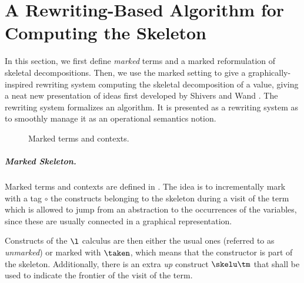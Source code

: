 
\section{A Rewriting-Based Algorithm for Computing the Skeleton}
\label{sect:algorithm}

In this section, we first define \emph{marked} terms and a marked reformulation of skeletal decompositions. Then, we use the marked setting to give a graphically-inspired rewriting system computing the skeletal decomposition of a value, giving a neat new presentation of ideas first developed by Shivers and Wand \cite{DBLP:journals/fuin/ShiversW10}. The rewriting system formalizes an algorithm. It is presented as a rewriting system as to smoothly manage it as an operational semantics notion.



\begin{figure}[t!]
\centering
{}
\caption{Marked terms and contexts.}
\label{fig:marked-terms}
\end{figure}

\subparagraph{Marked Skeleton.} Marked terms and contexts are defined in . The idea is to incrementally mark with a tag $\circ$ the constructs belonging to the skeleton during a visit of the term which is allowed to jump from an abstraction to the occurrences of the variables, since these are usually connected in a graphical representation. 

Constructs of the $\l$ calculus are then either the usual ones (referred to as \emph{unmarked}) or marked with $\taken$, which means that the constructor is part of the skeleton. Additionally, there is an extra \emph{up} construct $\skelu\tm$ that shall be used to indicate the frontier of the visit of the term. 

